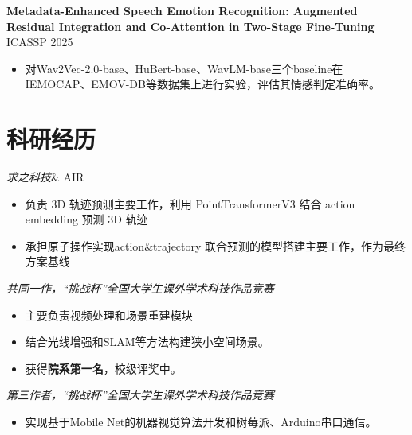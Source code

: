 \documentclass{resume}
\begin{document}
\vspace{1ex}

\textbf{Metadata-Enhanced Speech Emotion Recognition: Augmented Residual Integration and Co-Attention in Two-Stage Fine-Tuning} \hfill {ICASSP 2025 }
\vspace{1ex}
\;
\vspace{0.5ex}
\begin{itemize}
    \item 对Wav2Vec-2.0-base、HuBert-base、WavLM-base三个baseline在IEMOCAP、EMOV-DB等数据集上进行实验，评估其情感判定准确率。
\end{itemize}

\vspace{1ex}

\section{科研经历}


\textit{求之科技}\& AIR
\vspace{0.5ex}
\begin{itemize}
    \item 负责 3D 轨迹预测主要工作，利用 PointTransformerV3 结合 action embedding 预测 3D 轨迹
    \item 承担原子操作实现action\&trajectory 联合预测的模型搭建主要工作，作为最终方案基线
\end{itemize}

\vspace{1ex}


\textit{共同一作，“挑战杯”全国大学生课外学术科技作品竞赛}
\vspace{0.5ex}
\begin{itemize}
    \item 主要负责视频处理和场景重建模块
    \item 结合光线增强和SLAM等方法构建狭小空间场景。
    \item 获得\textbf{院系第一名}，校级评奖中。
\end{itemize}

\vspace{1ex}


\textit{第三作者，“挑战杯”全国大学生课外学术科技作品竞赛}{}
\vspace{0.5ex}
\begin{itemize}
    \item 实现基于Mobile Net的机器视觉算法开发和树莓派、Arduino串口通信。
\end{itemize}

\vspace{1ex}
\end{document}
